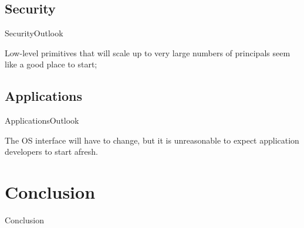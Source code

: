 \documentclass[10pt]{beamer}
\begin{document}
\subsection{Security}
\begin{frame}{Security}{Outlook}
  \begin{block}{}
    Low-level primitives that will scale up to very large numbers of principals
    seem like a good place to start;
  \end{block}
\end{frame}

\subsection{Applications}
\begin{frame}{Applications}{Outlook}
  \begin{block}{}
    The OS interface will have to change, but it is unreasonable to expect
    application developers to start afresh.
  \end{block}
\end{frame}

\section{Conclusion}
\begin{frame}{Conclusion}{}
\end{frame}

{\1
\begin{frame}
\end{frame}}
\end{document}
